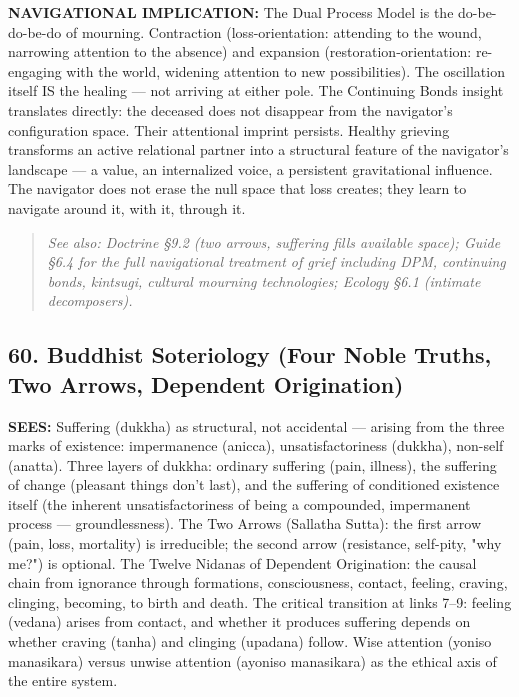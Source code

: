 \textbf{NAVIGATIONAL IMPLICATION:} The Dual Process Model is the do-be-do-be-do of mourning. Contraction (loss-orientation: attending to the wound, narrowing attention to the absence) and expansion (restoration-orientation: re-engaging with the world, widening attention to new possibilities). The oscillation itself IS the healing — not arriving at either pole. The Continuing Bonds insight translates directly: the deceased does not disappear from the navigator's configuration space. Their attentional imprint persists. Healthy grieving transforms an active relational partner into a structural feature of the navigator's landscape — a value, an internalized voice, a persistent gravitational influence. The navigator does not erase the null space that loss creates; they learn to navigate around it, with it, through it.


\begin{quote}
\itshape
\textit{See also: Doctrine §9.2 (two arrows, suffering fills available space); Guide §6.4 for the full navigational treatment of grief including DPM, continuing bonds, kintsugi, cultural mourning technologies; Ecology §6.1 (intimate decomposers).}
\end{quote}


\bigskip\noindent\makebox[\textwidth]{\color{rulegray}\rule{5cm}{0.3pt}}\bigskip


\subsection*{60. Buddhist Soteriology (Four Noble Truths, Two Arrows, Dependent Origination)}


\textbf{SEES:} Suffering (dukkha) as structural, not accidental — arising from the three marks of existence: impermanence (anicca), unsatisfactoriness (dukkha), non-self (anatta). Three layers of dukkha: ordinary suffering (pain, illness), the suffering of change (pleasant things don't last), and the suffering of conditioned existence itself (the inherent unsatisfactoriness of being a compounded, impermanent process — groundlessness). The Two Arrows (Sallatha Sutta): the first arrow (pain, loss, mortality) is irreducible; the second arrow (resistance, self-pity, "why me?") is optional. The Twelve Nidanas of Dependent Origination: the causal chain from ignorance through formations, consciousness, contact, feeling, craving, clinging, becoming, to birth and death. The critical transition at links 7–9: feeling (vedana) arises from contact, and whether it produces suffering depends on whether craving (tanha) and clinging (upadana) follow. Wise attention (yoniso manasikara) versus unwise attention (ayoniso manasikara) as the ethical axis of the entire system.


